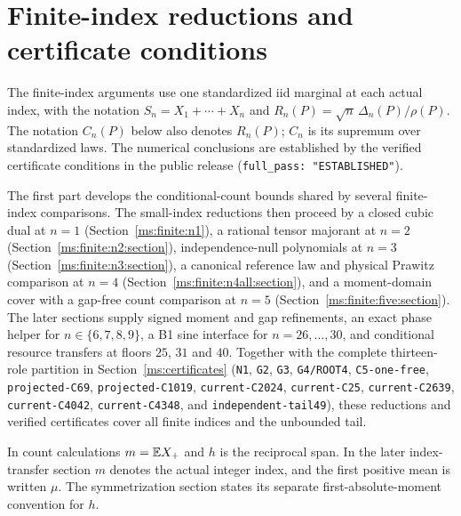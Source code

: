 \section{Finite-index reductions and certificate conditions}
\label{ms:finite:scope}
The finite-index arguments use one standardized iid marginal at each actual
index, with the notation $S_n=X_1+\cdots+X_n$ and
$R_n(P)=\sqrt n\,\Delta_n(P)/\rho(P)$. The notation $C_n(P)$ below
also denotes $R_n(P)$; $C_n$ is its supremum over standardized laws.
The numerical conclusions are established by the verified certificate conditions
in the public release (\texttt{full\_pass: "ESTABLISHED"}).

The first part develops the conditional-count bounds shared by several
finite-index comparisons. The small-index reductions then proceed by a
closed cubic dual at $n=1$ (Section~\ref{ms:finite:n1}), a rational tensor
majorant at $n=2$ (Section~\ref{ms:finite:n2:section}), independence-null
polynomials at $n=3$ (Section~\ref{ms:finite:n3:section}), a canonical
reference law and physical Prawitz comparison at $n=4$
(Section~\ref{ms:finite:n4all:section}), and a moment-domain cover with a
gap-free count comparison at $n=5$ (Section~\ref{ms:finite:five:section}).
The later sections supply signed moment and gap refinements, an exact phase
helper for $n\in\{6,7,8,9\}$, a B1 sine interface for $n=26,\ldots,30$,
and conditional resource transfers at floors $25$, $31$ and $40$.
Together with the complete thirteen-role partition in Section~\ref{ms:certificates}
(\texttt{N1}, \texttt{G2}, \texttt{G3}, \texttt{G4/ROOT4}, \texttt{C5-one-free},
\texttt{projected-C69}, \texttt{projected-C1019}, \texttt{current-C2024},
\texttt{current-C25}, \texttt{current-C2639}, \texttt{current-C4042},
\texttt{current-C4348}, and \texttt{independent-tail49}), these reductions and
verified certificates cover all finite indices and the unbounded tail.

In count calculations $m=\mathbb E X_+$ and $h$ is the reciprocal span.
In the later index-transfer section $m$ denotes the actual integer index,
and the first positive mean is written $\mu$. The symmetrization section
states its separate first-absolute-moment convention for $h$.


